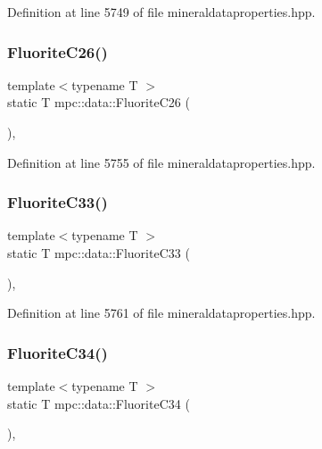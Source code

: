 Definition at line 5749 of file mineraldataproperties.\+hpp.

\mbox{\label{namespacempc_1_1data_a61d7b717b2a87c05f67a1fd6d6dfb848}} 
\subsubsection{\texorpdfstring{Fluorite\+C26()}{FluoriteC26()}}
{\footnotesize\ttfamily template$<$typename T $>$ \\
static T mpc\+::data\+::\+Fluorite\+C26 (\begin{DoxyParamCaption}{ }\end{DoxyParamCaption})\hspace{0.3cm}{\ttfamily [inline]}, {\ttfamily [static]}}



Definition at line 5755 of file mineraldataproperties.\+hpp.

\mbox{\label{namespacempc_1_1data_afbf1246c248616bc0bf03b91ac749c9c}} 
\subsubsection{\texorpdfstring{Fluorite\+C33()}{FluoriteC33()}}
{\footnotesize\ttfamily template$<$typename T $>$ \\
static T mpc\+::data\+::\+Fluorite\+C33 (\begin{DoxyParamCaption}{ }\end{DoxyParamCaption})\hspace{0.3cm}{\ttfamily [inline]}, {\ttfamily [static]}}



Definition at line 5761 of file mineraldataproperties.\+hpp.

\mbox{\label{namespacempc_1_1data_a4023047632efbf412ca65cb91637dd8f}} 
\subsubsection{\texorpdfstring{Fluorite\+C34()}{FluoriteC34()}}
{\footnotesize\ttfamily template$<$typename T $>$ \\
static T mpc\+::data\+::\+Fluorite\+C34 (\begin{DoxyParamCaption}{ }\end{DoxyParamCaption})\hspace{0.3cm}{\ttfamily [inline]}, {\ttfamily [static]}}



